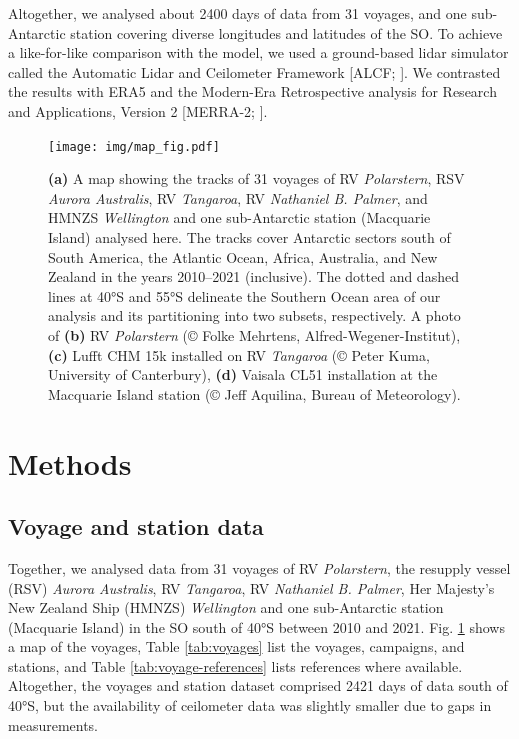 \documentclass[12pt,a4paper]{article}
\begin{document}
Altogether, we analysed about 2400 days of data from 31 voyages, and one
sub-Antarctic station covering diverse longitudes and latitudes of the SO. To
achieve a like-for-like comparison with the model, we used a ground-based lidar
simulator called the Automatic Lidar and Ceilometer Framework [ALCF;
\cite{kuma2021}]. We contrasted the results with ERA5 \citep{era5} and the
Modern-Era Retrospective analysis for Research and Applications, Version 2
[MERRA-2; \cite{gelaro2017}].

\begin{figure}[b!]
\centering
\texttt{[image: img/map\_fig.pdf]}
\caption{
\textbf{(a)} A map showing the tracks of 31 voyages of RV \emph{Polarstern},
RSV \emph{Aurora Australis}, RV \emph{Tangaroa}, RV \emph{Nathaniel B. Palmer},
and HMNZS \emph{Wellington} and one sub-Antarctic station (Macquarie Island)
analysed here. The tracks cover Antarctic sectors south of South America, the
Atlantic Ocean, Africa, Australia, and New Zealand in the years 2010--2021
(inclusive).  The dotted and dashed lines at 40°S and 55°S delineate the
Southern Ocean area of our analysis and its partitioning into two subsets,
respectively.  A photo of \textbf{(b)} RV \emph{Polarstern} (© Folke Mehrtens,
Alfred-Wegener-Institut), \textbf{(c)} Lufft CHM 15k installed on RV
\emph{Tangaroa} (© Peter Kuma, University of Canterbury), \textbf{(d)} Vaisala
CL51 installation at the Macquarie Island station (© Jeff Aquilina, Bureau of
Meteorology).
}
\label{fig:map}
\end{figure}

\section{Methods}
\label{sec:methods}

\subsection{Voyage and station data}

Together, we analysed data from 31 voyages of RV \emph{Polarstern}, the resupply
vessel (RSV) \emph{Aurora Australis}, RV \emph{Tangaroa}, RV \emph{Nathaniel B.
Palmer}, Her Majesty's New Zealand Ship (HMNZS) \emph{Wellington} and one
sub-Antarctic station (Macquarie Island) in the SO south of 40°S between 2010
and 2021. Fig. \ref{fig:map} shows a map of the voyages, Table
\ref{tab:voyages} list the voyages, campaigns, and stations, and Table
\ref{tab:voyage-references} lists references where available. Altogether, the
voyages and station dataset comprised 2421 days of data south of 40°S, but the
availability of ceilometer data was slightly smaller due to gaps in
measurements.
\end{document}
